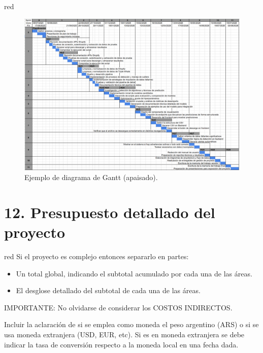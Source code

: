 \documentclass[
11pt, %
]{charter}
\begin{document}
\begin{consigna}{red}
\begin{landscape}
\begin{figure}[htpb]
\centering 
\includegraphics[height=.85\textheight]{./Figuras/Gantt-2.png}
\caption{Ejemplo de diagrama de Gantt (apaisado).} %
\label{fig:diagGantt}
\end{figure}

\end{landscape}

\end{consigna}


\section{12. Presupuesto detallado del proyecto}
\label{sec:presupuesto}

\begin{consigna}{red}
Si el proyecto es complejo entonces separarlo en partes:
\begin{itemize}
	\item Un total global, indicando el subtotal acumulado por cada una de las áreas.
	\item El desglose detallado del subtotal de cada una de las áreas.
\end{itemize}

IMPORTANTE: No olvidarse de considerar los COSTOS INDIRECTOS.

Incluir la aclaración de si se emplea como moneda el peso argentino (ARS) o si se usa moneda extranjera (USD, EUR, etc). Si es en moneda extranjera se debe indicar la tasa de conversión respecto a la moneda local en una fecha dada.

\end{consigna}
\end{document}
